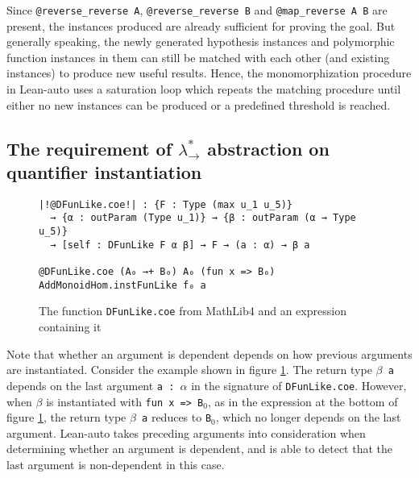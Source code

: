 Since \texttt{@reverse\_reverse A}, \texttt{@reverse\_reverse B} and \texttt{@map\_reverse A B}
are present, the instances produced are already sufficient for proving the goal.
But generally speaking, the newly generated hypothesis instances and polymorphic function instances
in them can still be matched with each other (and existing instances) to produce new useful results.
Hence, the monomorphization procedure in Lean-auto uses a saturation loop which
repeats the matching procedure until either no new instances can be produced or a predefined
threshold is reached.

\subsection{The requirement of $\lambda_\to^*$ abstraction on quantifier instantiation} \label{exqdet}

\begin{figure}
  \begin{CenteredBox}
    \begin{lstlisting}[style=leanHH]
|!@DFunLike.coe!| : {F : Type (max u_1 u_5)}
  → {α : outParam (Type u_1)} → {β : outParam (α → Type u_5)}
  → [self : DFunLike F α β] → F → (a : α) → β a

@DFunLike.coe (A₀ →+ B₀) A₀ (fun x => B₀) AddMonoidHom.instFunLike f₀ a 
    \end{lstlisting}
  \end{CenteredBox}
  \caption{The function \texttt{DFunLike.coe} from MathLib4 and an expression
  containing it}
  \label{dfun}
\end{figure}

Note that whether an argument is dependent depends on how previous arguments
are instantiated. Consider the example shown in figure \ref{dfun}. The return
type \texttt{$\beta$ a} depends on the last argument \texttt{a : $\alpha$} in the signature of
\texttt{DFunLike.coe}. However, when $\beta$ is instantiated with \texttt{fun x => B$_0$}, as in the
expression at the bottom of figure \ref{dfun}, the return type \texttt{$\beta$ a} reduces to \texttt{B$_0$},
which no longer depends on the last argument. Lean-auto takes preceding arguments into
consideration when determining whether an argument is dependent, and is able to detect
that the last argument is non-dependent in this case.